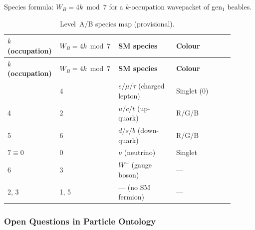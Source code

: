 Species formula: $W_B = 4k \bmod 7$ for a $k$-occupation wavepacket of gen$_1$ beables.

\begingroup\footnotesize\renewcommand{\arraystretch}{1.2}
\begin{longtable}{@{}P{0.18\linewidth}P{0.22\linewidth}P{0.25\linewidth}P{0.25\linewidth}@{}}
\caption{Level~A/B species map (provisional).}
\label{tab:mi-species-map}\\
\toprule
\textbf{$k$ (occupation)} & \textbf{$W_B = 4k \bmod 7$} &
  \textbf{SM species} & \textbf{Colour} \\
\midrule
\endfirsthead
\midrule
\textbf{$k$ (occupation)} & \textbf{$W_B = 4k \bmod 7$} &
  \textbf{SM species} & \textbf{Colour} \\
\midrule
\endhead
\bottomrule
{} & 4 & $e/\mu/\tau$ (charged lepton) & Singlet (0) \\
4 & 2 & $u/c/t$ (up-quark) & R/G/B \\
5 & 6 & $d/s/b$ (down-quark) & R/G/B \\
$7 \equiv 0$ & 0 & $\nu$ (neutrino) & Singlet \\
6 & 3 & $W^+$ (gauge boson) & --- \\
2, 3 & 1, 5 & --- (no SM fermion) & --- \\
\end{longtable}
\endgroup

\subsubsection{Open Questions in Particle Ontology}
\label{sec:mi-ontology-open}

